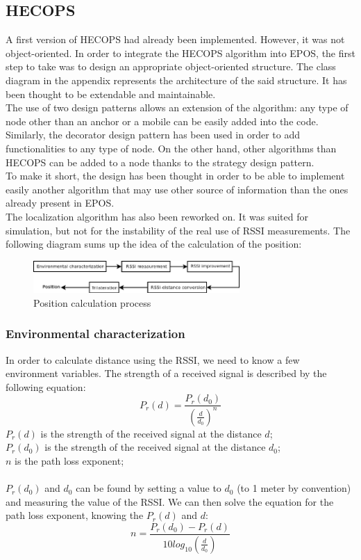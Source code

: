 \documentclass[a4paper,10pt]{article}
\begin{document}
\subsection{HECOPS}
A first version of HECOPS had already been implemented. However, it was not object-oriented. In order to integrate the HECOPS algorithm into EPOS, 
the first step to take was to design an appropriate object-oriented structure. The class diagram in the appendix represents the architecture of the 
said structure. It has been thought to be extendable and maintainable.\\
The use of two design patterns allows an extension of the algorithm: any type of node other than an anchor or a mobile can be easily added into the 
code. Similarly, the decorator design pattern has been used in order to add functionalities to any type of node. On the other hand, other algorithms 
than HECOPS can be added to a node thanks to the strategy design pattern.\\
To make it short, the design has been thought in order to be able to implement easily another algorithm that may use other source of information 
than the ones already present in EPOS.\\
The localization algorithm has also been reworked on. It was suited for simulation, but not for the instability of the real use of RSSI measurements.
The following diagram sums up the idea of the calculation of the position:\\
\begin{figure}[H]
  \centering
   \includegraphics[width=0.7\textwidth]{process_hecops.png}
  \caption{Position calculation process}
\end{figure}

\subsubsection{Environmental characterization}
In order to calculate distance using the RSSI, we need to know a few environment variables. The strength of a received signal is described by the
following equation:
$$
P_r(d)= \frac{P_r(d_0)}{(\frac{d}{d_0})^n}
$$
$P_r(d)$ is the strength of the received signal at the distance $d$; \\
$P_r(d_0)$ is the strength of the received signal at the distance $d_0$; \\
$n$ is the path loss exponent;\\ \\
$P_r(d_0)$ and $d_0$ can be found by setting a value to $d_0$ (to 1 meter by convention) and measuring the value of the RSSI. 
We can then solve the equation for the path loss exponent, knowing the $P_r(d)$ and $d$:
$$ n = \frac{P_r(d_0) - P_r(d)}{10log_{10}(\frac{d}{d_0})} $$
\end{document}
